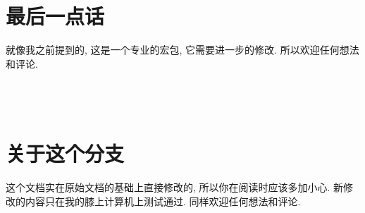 \documentclass[11pt,a4paper]{article}
\begin{document}
\section{最后一点话}
就像我之前提到的, 这是一个专业的宏包, 它需要进一步的修改. 所以欢迎任何想法和评论.
\\

\\
\\[10pt]
\\

\raggedright

\section{关于这个分支}
这个文档实在原始文档的基础上直接修改的, 所以你在阅读时应该多加小心. 新修改的内容只在我的膝上计算机上测试通过. 同样欢迎任何想法和评论.
\\
\\
\\[10pt]
                  
\end{document}
